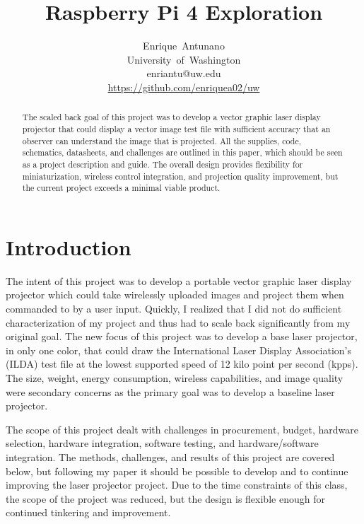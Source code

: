 \documentclass[journal]{IEEEtran}
\begin{document}
    \title{Raspberry Pi 4 Exploration}

    \author{Enrique~Antunano\\University~of~Washington\\enriantu@uw.edu\\{\href{https://github.com/enriquea02/uw/tree/main/eep522a_embedded_and_real-time_systems/submissions/workspace}{https://github.com/enriquea02/uw}}}


    \maketitle

    \begin{abstract}
        The scaled back goal of this project was to develop a vector graphic laser display projector that could display a vector image test file with sufficient accuracy that an observer can understand the image that is projected.
        All the supplies, code, schematics, datasheets, and challenges are outlined in this paper, which should be seen as a project description and guide.
        The overall design provides flexibility for miniaturization, wireless control integration, and projection quality improvement, but the current project exceeds a minimal viable product.
    \end{abstract}
    \section{Introduction}
    The intent of this project was to develop a portable vector graphic laser display projector which could take wirelessly uploaded images and project them when commanded to by a user input.
    Quickly, I realized that I did not do sufficient characterization of my project and thus had to scale back significantly from my original goal.
    The new focus of this project was to develop a base laser projector, in only one color, that could draw the International Laser Display Association's (ILDA) test file at the lowest supported speed of 12 kilo point per second (kpps).
    The size, weight, energy consumption, wireless capabilities, and image quality were secondary concerns as the primary goal was to develop a baseline laser projector.

    The scope of this project dealt with challenges in procurement, budget, hardware selection, hardware integration, software testing, and hardware/software integration. 
    The methods, challenges, and results of this project are covered below, but following my paper it should be possible to develop and to continue improving the laser projector project.
    Due to the time constraints of this class, the scope of the project was reduced, but the design is flexible enough for continued tinkering and improvement.
\end{document}
